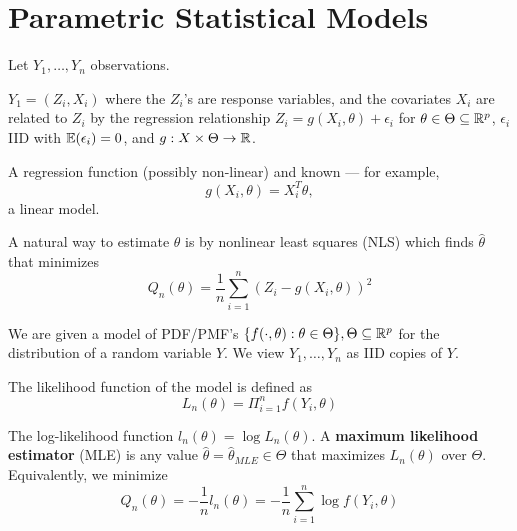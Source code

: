 
\chapter{Parametric Statistical Models}
\label{cha:param-stat-models}

Let $Y_{1}, \dots, Y_{n}$ observations.

\begin{exmp}
  \label{defn:parametric_statistical_models:3}
  $Y_{1} = (Z_{i}, X_{i})$ where the $Z_{i}$'s are response variables,
  and the covariates $X_{i}$ are related to $Z_{i}$ by the regression
  relationship $Z_{i} = g(X_{i}, \theta) + \epsilon_{i}$ for $\theta
  \in \Theta \subseteq \mathbb{R}^{p}$, $\epsilon_{i}$ IID with
  $\E{\epsilon_{i}} = 0$, and $g: X \times \Theta \rightarrow \mathbb{R}$.

  A regression function (possibly non-linear) and known --- for example,
  \begin{equation}
    \label{eq:14}
    g(X_{i}, \theta) = X_{i}^{T} \theta,
  \end{equation} a linear model.
\end{exmp}


A natural way to estimate $\theta$ is by nonlinear least squares (NLS)
which finds $\hat \theta$ that minimizes
\begin{equation}
  \label{eq:20}
  Q_{n}(\theta) = \frac{1}{n} \sum_{i=1}^{n}(Z_{i}- g(X_{i}, \theta))^{2}
\end{equation}

\begin{exmp}
  \label{defn:parametric_statistical_models:2}
  We are given a model of PDF/PMF's $\{ f(\cdot, \theta): \theta \in
  \Theta \}, \Theta \subseteq \mathbb{R}^{p}$ for the distribution of a random
  variable $Y$.  We view $Y_{1}, \dots, Y_{n}$ as IID copies of $Y$.

  The likelihood function of the model  is defined as
  \begin{equation}
    \label{eq:30}
    L_{n}(\theta) = \Pi_{i=1}^{n} f(Y_{i}, \theta)
  \end{equation}

  The log-likelihood function $l_{n}(\theta) = \log L_{n}(\theta)$.  A
  \textbf{maximum likelihood estimator} (MLE) is any value $\hat
  \theta = \hat \theta_{MLE} \in \Theta$ that maximizes
  $L_{n}(\theta)$ over $\Theta$.  Equivalently, we minimize
  \begin{equation}
    \label{eq:31}
    Q_{n}(\theta) = -\frac{1}{n} l_{n}(\theta) = - \frac{1}{n}
    \sum_{i=1}^{n} \log f(Y_{i}, \theta)
  \end{equation}
\end{exmp}

